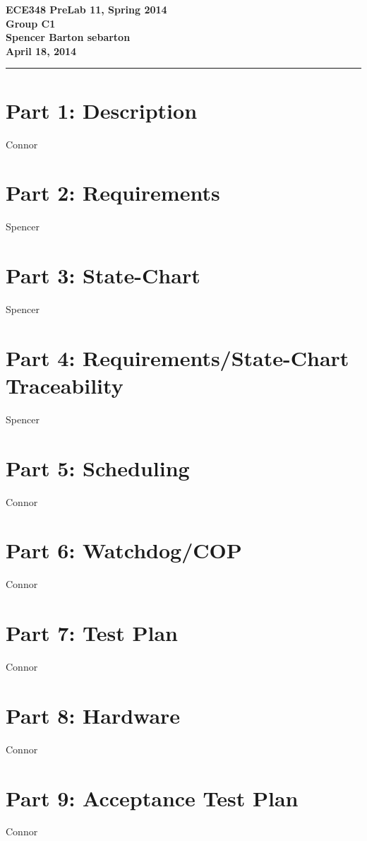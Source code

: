 \documentclass{article}
\newcommand{\assignment}{PreLab 11}
\newcommand{\duedate}{April 18, 2014}
\newcommand{\header}{\noindent \textbf{ECE348 \assignment, Spring 2014 \\
					 Group C1 \\ 
					 Spencer Barton sebarton \\
					 \duedate} \vspace{0.10in} \hrule}
\begin{document}
    

\header


\section*{Part 1: Description}

Connor

\section*{Part 2: Requirements}

Spencer

\section*{Part 3: State-Chart}

Spencer

\section*{Part 4: Requirements/State-Chart Traceability}

Spencer

\section*{Part 5: Scheduling}

Connor

\section*{Part 6: Watchdog/COP}

Connor

\section*{Part 7: Test Plan}

Connor

\section*{Part 8: Hardware}

Connor

\section*{Part 9: Acceptance Test Plan}

Connor
		
\end{document}
